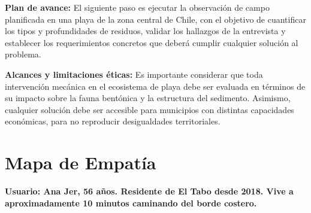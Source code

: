 \documentclass[12pt, letterpaper]{article}
\begin{document}
\textbf{Plan de avance:} El siguiente paso es ejecutar la observación de campo
planificada en una playa de la zona central de Chile, con el objetivo de cuantificar
los tipos y profundidades de residuos, validar los hallazgos de la entrevista y
establecer los requerimientos concretos que deberá cumplir cualquier solución al problema.

\textbf{Alcances y limitaciones éticas:} Es importante considerar que toda intervención
mecánica en el ecosistema de playa debe ser evaluada en términos de su impacto sobre
la fauna bentónica y la estructura del sedimento. Asimismo, cualquier solución debe
ser accesible para municipios con distintas capacidades económicas, para no reproducir
desigualdades territoriales.

\newpage
\printbibliography[title={Referencias Bibliográficas}]

\newpage
\appendix
\section{Mapa de Empatía}
\label{anexo:empatia}

\textbf{Usuario: Ana Jer, 56 años. Residente de El Tabo desde 2018.
	Vive a aproximadamente 10 minutos caminando del borde costero.}
\end{document}
